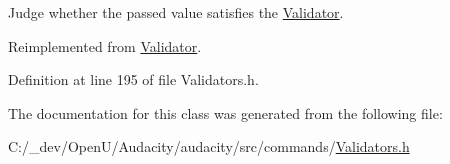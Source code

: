 Judge whether the passed value satisfies the \hyperlink{class_validator}{Validator}. 



Reimplemented from \hyperlink{class_validator_af3894f81595f2ce9d5c18c875a4a9472}{Validator}.



Definition at line 195 of file Validators.\+h.



The documentation for this class was generated from the following file\+:\begin{DoxyCompactItemize}
\item 
C\+:/\+\_\+dev/\+Open\+U/\+Audacity/audacity/src/commands/\hyperlink{_validators_8h}{Validators.\+h}\end{DoxyCompactItemize}
